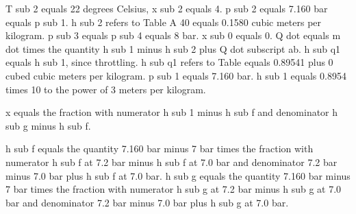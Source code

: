 T sub 2 equals 22 degrees Celsius, x sub 2 equals 4. 
p sub 2 equals 7.160 bar equals p sub 1. 
h sub 2 refers to Table A 40 equals 0.1580 cubic meters per kilogram. 
p sub 3 equals p sub 4 equals 8 bar. 
x sub 0 equals 0. 
Q dot equals m dot times the quantity h sub 1 minus h sub 2 plus Q dot subscript ab. 
h sub q1 equals h sub 1, since throttling. 
h sub q1 refers to Table equals 0.89541 plus 0 cubed cubic meters per kilogram. 
p sub 1 equals 7.160 bar. 
h sub 1 equals 0.8954 times 10 to the power of 3 meters per kilogram.

x equals the fraction with numerator h sub 1 minus h sub f and denominator h sub g minus h sub f.

h sub f equals the quantity 7.160 bar minus 7 bar times the fraction with numerator h sub f at 7.2 bar minus h sub f at 7.0 bar and denominator 7.2 bar minus 7.0 bar plus h sub f at 7.0 bar. 
h sub g equals the quantity 7.160 bar minus 7 bar times the fraction with numerator h sub g at 7.2 bar minus h sub g at 7.0 bar and denominator 7.2 bar minus 7.0 bar plus h sub g at 7.0 bar.